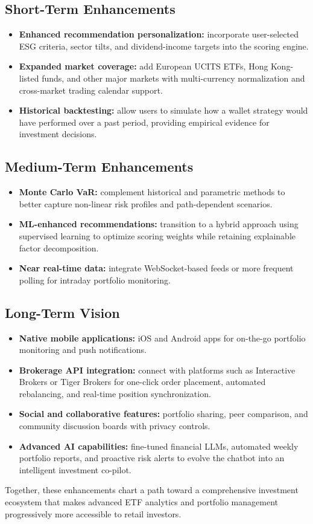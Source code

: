 \subsection{Short-Term Enhancements}
\begin{itemize}
    \item \textbf{Enhanced recommendation personalization:} incorporate user-selected ESG criteria, sector tilts, and dividend-income targets into the scoring engine.
    \item \textbf{Expanded market coverage:} add European UCITS ETFs, Hong Kong-listed funds, and other major markets with multi-currency normalization and cross-market trading calendar support.
    \item \textbf{Historical backtesting:} allow users to simulate how a wallet strategy would have performed over a past period, providing empirical evidence for investment decisions.
\end{itemize}

\subsection{Medium-Term Enhancements}
\begin{itemize}
    \item \textbf{Monte Carlo VaR:} complement historical and parametric methods to better capture non-linear risk profiles and path-dependent scenarios.
    \item \textbf{ML-enhanced recommendations:} transition to a hybrid approach using supervised learning to optimize scoring weights while retaining explainable factor decomposition.
    \item \textbf{Near real-time data:} integrate WebSocket-based feeds or more frequent polling for intraday portfolio monitoring.
\end{itemize}

\subsection{Long-Term Vision}
\begin{itemize}
    \item \textbf{Native mobile applications:} iOS and Android apps for on-the-go portfolio monitoring and push notifications.
    \item \textbf{Brokerage API integration:} connect with platforms such as Interactive Brokers or Tiger Brokers for one-click order placement, automated rebalancing, and real-time position synchronization.
    \item \textbf{Social and collaborative features:} portfolio sharing, peer comparison, and community discussion boards with privacy controls.
    \item \textbf{Advanced AI capabilities:} fine-tuned financial LLMs, automated weekly portfolio reports, and proactive risk alerts to evolve the chatbot into an intelligent investment co-pilot.
\end{itemize}

Together, these enhancements chart a path toward a comprehensive investment ecosystem that makes advanced ETF analytics and portfolio management progressively more accessible to retail investors.
